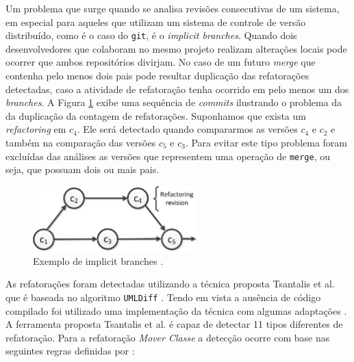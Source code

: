 \documentclass[12pt]{article}
\begin{document}
Um problema que surge quando se analisa revisões consecutivas de um sistema, em especial para aqueles que utilizam um sistema de controle de versão distribuído, como é o caso do \texttt{git}, é o \textit{implicit branches}{}. Quando dois desenvolvedores que colaboram no mesmo projeto realizam alterações locais pode ocorrer que ambos repositórios divirjam. No caso de um futuro \textit{merge}{} que contenha pelo menos dois pais pode resultar duplicação das refatorações detectadas, caso a atividade de refatoração tenha ocorrido em pelo menos um dos \textit{branches}{}. A  Figura \ref{fig:implicit_brache} exibe uma sequência de \textit{commits} ilustrando o problema da da duplicação da contagem de refatorações. Suponhamos que exista um \textit{refactoring} em $c_4${}. Ele será detectado quando compararmos as versões $c_4$ e $c_2$ e também na comparação das versões $c_5$ e $c_3$. Para evitar este tipo problema foram excluídas das análises as versões que representem uma operação de \texttt{merge}, ou seja, que possuam dois ou mais pais.

\begin{figure}[!t]
	\centering
	\includegraphics[width=2.5in]{../img/implicit_branche}
	\caption{Exemplo de implicit branches \cite{Tsantalis2013}{}.}
	\label{fig:implicit_brache}
\end{figure}

As refatorações foram detectadas utilizando a técnica proposta Tsantalis et al. \cite{Tsantalis2013}{} que é baseada no algoritmo \texttt{UMLDiff} \cite{Xing:2005:UAO:1101908.1101919}. Tendo em vista a ausência de código compilado foi utilizado uma implementação da técnica com algumas adaptações \cite{Danilo}. A ferramenta proposta Tsantalis et al. é capaz de detectar 11 tipos diferentes de refatoração. Para a refatoração \textit{Mover Classe} a detecção ocorre com base nas seguintes regras definidas por \cite{Biegel:2011:CSM:1985441.1985452}:
\end{document}
